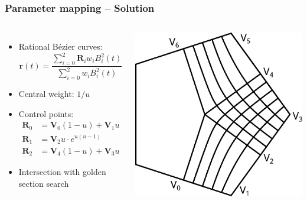 \documentclass{beamer}
\begin{document}
\begin{frame}
  \frametitle{Parameter mapping -- Solution}
  \begin{columns}   
    \begin{itemize}
    \item Rational B\'ezier curves:
      \[\mathbf{r}(t)=\frac{\sum_{i=0}^{2}\mathbf{R}_{i}w_{i}B_{i}^{2}(t)}{\sum_{i=0}^{2}w_{i}B_{i}^{2}(t)}\]
    \item Central weight: $1/u$
    \item Control points:
      \[\begin{aligned}
      \mathbf{R}_{0}&=\mathbf{V}_{0}(1-u)+\mathbf{V}_{1}u\\
      \mathbf{R}_{1}&=\mathbf{V}_{2}u\cdot e^{u(u-1)}\\
      \mathbf{R}_{2}&=\mathbf{V}_{4}(1-u)+\mathbf{V}_{3}u
      \end{aligned}\]
    \item Intersection with golden section search
    \end{itemize}
    \centering
    \includegraphics[width=\textwidth]{images/rational.pdf}\vspace{1em}

\end{columns}
\end{frame}
\end{document}
